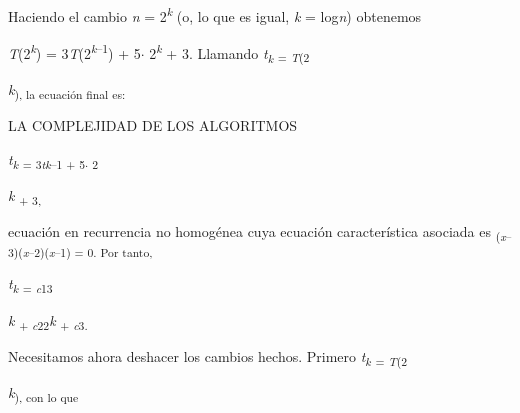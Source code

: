 \documentclass[12pt]{article}
\renewcommand{\_}{\kern-1.5pt\textunderscore\kern-1.5pt}
\begin{document}
\begin{adjustwidth}{0.58in}{1.61in}
{\fontsize{10pt}{12.0pt}\selectfont Haciendo el cambio \textit{n }= 2\textit{\textsuperscript{k }}(o, lo que es igual, \textit{k }= log\textit{n}) obtenemos \par}\par

\end{adjustwidth}

\begin{adjustwidth}{0.58in}{2.32in}
{\fontsize{10pt}{12.0pt}\selectfont \textit{T}(2\textit{\textsuperscript{k}}) = 3\textit{T}(2\textit{\textsuperscript{k}}\textsuperscript{–1}) + 5$ \cdot $ 2\textit{\textsuperscript{k }}+ 3. Llamando \textit{t\textsubscript{k }}\textsubscript{= \textit{T}(2}{\fontsize{7pt}{8.4pt}\selectfont \textit{k}\textsubscript{), la ecuación final es: }\par}\par}\par

\end{adjustwidth}

{\fontsize{7pt}{8.4pt}\selectfont LA COMPLEJIDAD DE LOS ALGORITMOS {\fontsize{10pt}{12.0pt} \par}\par}\par

\begin{Center}
{\fontsize{10pt}{12.0pt}\selectfont \textit{t\textsubscript{k }}\textsubscript{= 3\textit{tk}–1 + 5$ \cdot $ 2}{\fontsize{7pt}{8.4pt}\selectfont \textit{k }\textsubscript{+ 3, }{\fontsize{10pt}{12.0pt}\selectfont ecuación en recurrencia no homogénea cuya ecuación característica asociada es \textsubscript{(\textit{x}–3)(\textit{x}–2)(\textit{x}–1) = 0. Por tanto, }\par}\par}\par}
\end{Center}\par

\begin{Center}
{\fontsize{10pt}{12.0pt}\selectfont \textit{t\textsubscript{k }}\textsubscript{= \textit{c}13}{\fontsize{7pt}{8.4pt}\selectfont \textit{k }\textsubscript{+ \textit{c}22}\textit{k }\textsubscript{+ \textit{c}3. }{\fontsize{10pt}{12.0pt}\selectfont Necesitamos ahora deshacer los cambios hechos. Primero \textit{t\textsubscript{k }}\textsubscript{= \textit{T}(2}{\fontsize{7pt}{8.4pt}\selectfont \textit{k}\textsubscript{), con lo que }\par}\par}\par}\par}
\end{Center}\par
\end{document}
